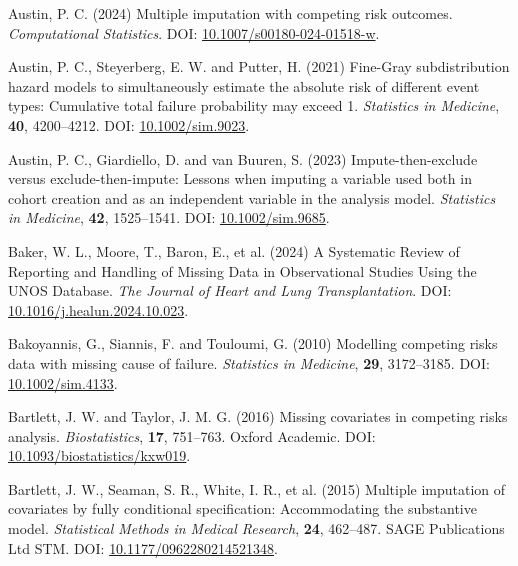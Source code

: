 \documentclass[
  letterpaper,
  paper=240mm:170mm,
  twoside=true,
  open=right,
  fontsize=10pt,
  pagesize=false,
  BCOR=15mm,
  DIV=14,
  headinclude=true,
  footinclude=false,
  headsepline=on]{scrbook}
\newlength{\cslhangindent}
\newenvironment{CSLReferences}[2] %
 {\begin{list}{}{%
  \setlength{\itemindent}{0pt}
  \setlength{\leftmargin}{0pt}
  \setlength{\parsep}{0pt}
  \ifodd #1
   \setlength{\leftmargin}{\cslhangindent}
   \setlength{\itemindent}{-1\cslhangindent}
  \fi
  \setlength{\itemsep}{#2\baselineskip}}}
 {\end{list}}
\begin{document}
\begin{CSLReferences}{1}{1}
Austin, P. C. (2024) Multiple imputation with competing risk outcomes.
\emph{Computational Statistics}. DOI:
\href{https://doi.org/10.1007/s00180-024-01518-w}{10.1007/s00180-024-01518-w}.

Austin, P. C., Steyerberg, E. W. and Putter, H. (2021) Fine-{Gray}
subdistribution hazard models to simultaneously estimate the absolute
risk of different event types: {Cumulative} total failure probability
may exceed 1. \emph{Statistics in Medicine}, \textbf{40}, 4200--4212.
DOI: \href{https://doi.org/10.1002/sim.9023}{10.1002/sim.9023}.

Austin, P. C., Giardiello, D. and van Buuren, S. (2023)
Impute-then-exclude versus exclude-then-impute: {Lessons} when imputing
a variable used both in cohort creation and as an independent variable
in the analysis model. \emph{Statistics in Medicine}, \textbf{42},
1525--1541. DOI:
\href{https://doi.org/10.1002/sim.9685}{10.1002/sim.9685}.

Baker, W. L., Moore, T., Baron, E., et al. (2024) A {Systematic Review}
of {Reporting} and {Handling} of {Missing Data} in {Observational
Studies Using} the {UNOS Database}. \emph{The Journal of Heart and Lung
Transplantation}. DOI:
\href{https://doi.org/10.1016/j.healun.2024.10.023}{10.1016/j.healun.2024.10.023}.

Bakoyannis, G., Siannis, F. and Touloumi, G. (2010) Modelling competing
risks data with missing cause of failure. \emph{Statistics in Medicine},
\textbf{29}, 3172--3185. DOI:
\href{https://doi.org/10.1002/sim.4133}{10.1002/sim.4133}.

Bartlett, J. W. and Taylor, J. M. G. (2016) Missing covariates in
competing risks analysis. \emph{Biostatistics}, \textbf{17}, 751--763.
Oxford Academic. DOI:
\href{https://doi.org/10.1093/biostatistics/kxw019}{10.1093/biostatistics/kxw019}.

Bartlett, J. W., Seaman, S. R., White, I. R., et al. (2015) Multiple
imputation of covariates by fully conditional specification:
{Accommodating} the substantive model. \emph{Statistical Methods in
Medical Research}, \textbf{24}, 462--487. SAGE Publications Ltd STM.
DOI:
\href{https://doi.org/10.1177/0962280214521348}{10.1177/0962280214521348}.


\end{CSLReferences}
\end{document}
